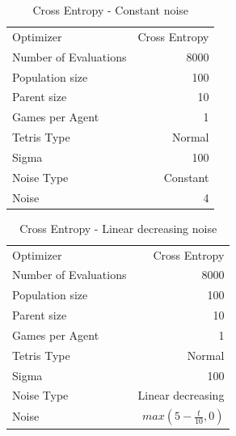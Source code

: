 \begin{table}[h!]
\centering
\begin{tabular}{l r}
Optimizer & Cross Entropy\\
Number of Evaluations & 8000\\
Population size & 100\\
Parent size & 10\\
Games per Agent & 1\\
Tetris Type & Normal\\
\hline
Sigma & 100\\
Noise Type & Constant\\
Noise & 4
\end{tabular}
\caption{Cross Entropy - Constant noise}
\end{table}

\begin{table}[h!]
\centering
\begin{tabular}{l r}
Optimizer & Cross Entropy\\
Number of Evaluations & 8000\\
Population size & 100\\
Parent size & 10\\
Games per Agent & 1\\
Tetris Type & Normal\\
\hline
Sigma & 100\\
Noise Type & Linear decreasing\\
Noise & $max \left( 5 - \frac{t}{10}, 0 \right)$
\end{tabular}
\caption{Cross Entropy - Linear decreasing noise}
\end{table}


\clearpage

